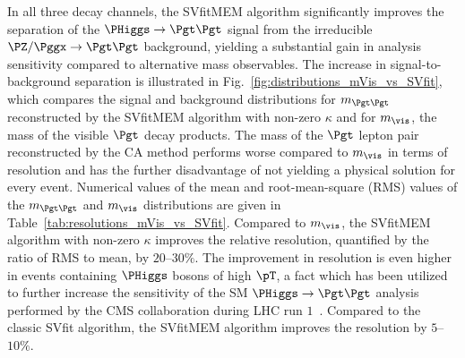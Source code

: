 In all three decay channels, the SVfitMEM algorithm significantly improves the separation of the $\PHiggs \to \Pgt\Pgt$ signal 
from the irreducible $\PZ/\Pggx \to \Pgt\Pgt$ background, yielding a substantial gain in analysis sensitivity
compared to alternative mass observables.
The increase in signal-to-background separation is illustrated in
Fig.~\ref{fig:distributions_mVis_vs_SVfit},
which compares the signal and background distributions for $m_{\Pgt\Pgt}$ reconstructed by the SVfitMEM algorithm with non-zero $\kappa$ and for $m_{\vis}$,
the mass of the visible $\Pgt$ decay products.
The mass of the $\Pgt$ lepton pair reconstructed by the CA method performs worse compared to $m_{\vis}$ in terms of resolution
and has the further disadvantage of not yielding a physical solution for every event.
Numerical values of the mean and root-mean-square (RMS) values
of the $m_{\Pgt\Pgt}$ and $m_{\vis}$ distributions are given in
Table~\ref{tab:resolutions_mVis_vs_SVfit}.
Compared to $m_{\vis}$,
the SVfitMEM algorithm with non-zero $\kappa$ improves the relative resolution,
quantified by the ratio of RMS to mean, by $20$--$30\%$.
The improvement in resolution is even higher in events containing $\PHiggs$ bosons of high $\pT$,
a fact which has been utilized to further increase the sensitivity of the SM $\PHiggs \to \Pgt\Pgt$ analysis performed by the CMS collaboration during LHC run $1$~\cite{HIG-13-004}.
Compared to the classic SVfit algorithm, the SVfitMEM algorithm improves the resolution by $5$--$10\%$.


